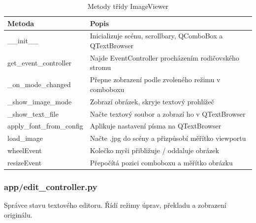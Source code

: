 \documentclass[FM,Proj]{tulthesis}
\begin{document}
\begin{table}[H]
	\centering
	\caption{Metody třídy ImageViewer}
	\begin{tabularx}{\textwidth}{|l|X|}
		\hline
		\textbf{Metoda} & \textbf{Popis} \\ \hline
		\_\_init\_\_              & Inicializuje scénu, scrollbary, QComboBox a QTextBrowser \\ \hline
		get\_event\_controller    & Najde EventController procházením rodičovského stromu \\ \hline
		\_on\_mode\_changed        & Přepne zobrazení podle zvoleného režimu v comboboxu \\ \hline
		\_show\_image\_mode        & Zobrazí obrázek, skryje textový prohlížeč \\ \hline
		\_show\_text\_file         & Načte textový soubor a zobrazí ho v QTextBrowser \\ \hline
		apply\_font\_from\_config  & Aplikuje nastavení písma na QTextBrowser \\ \hline
		load\_image               & Načte .jpg do scény a přizpůsobí měřítko viewportu \\ \hline
		wheelEvent                & Kolečko myši přibližuje / oddaluje obrázek \\ \hline
		resizeEvent               & Přepočítá pozici comboboxu a měřítko obrázku \\ \hline
	\end{tabularx}
	\label{tab:imageviewer}
\end{table}

\clearpage
\subsubsection{app/edit\_controller.py}

Správce stavu textového editoru. Řídí režimy úprav, překladu a zobrazení originálu.
\end{document}
